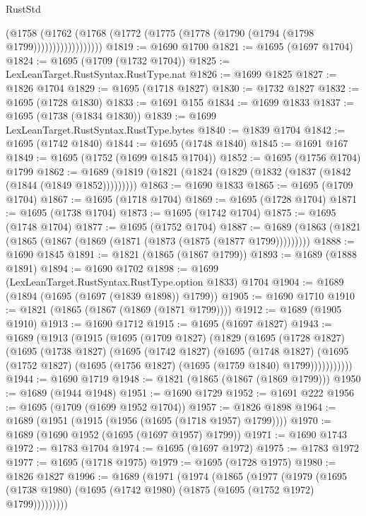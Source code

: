 \begin{lexlean}{RustStd}
\begin{coremodule}
                      (@1758
                        (@1762
                          (@1768 (@1772 (@1775 (@1778 (@1790 (@1794 (@1798 @1799))))))))))))))))))
@1819 := @1690 @1700
@1821 := @1695 (@1697 @1704)
@1824 := @1695 (@1709 (@1732 @1704))
@1825 := LexLeanTarget.RustSyntax.RustType.nat
@1826 := @1699 @1825
@1827 := @1826 @1704
@1829 := @1695 (@1718 @1827)
@1830 := @1732 @1827
@1832 := @1695 (@1728 @1830)
@1833 := @1691 @155
@1834 := @1699 @1833
@1837 := @1695 (@1738 (@1834 @1830))
@1839 := @1699 LexLeanTarget.RustSyntax.RustType.bytes
@1840 := @1839 @1704
@1842 := @1695 (@1742 @1840)
@1844 := @1695 (@1748 @1840)
@1845 := @1691 @167
@1849 := @1695 (@1752 (@1699 @1845 @1704))
@1852 := @1695 (@1756 @1704) @1799
@1862 := @1689 (@1819 (@1821 (@1824 (@1829 (@1832 (@1837 (@1842 (@1844 (@1849 @1852)))))))))
@1863 := @1690 @1833
@1865 := @1695 (@1709 @1704)
@1867 := @1695 (@1718 @1704)
@1869 := @1695 (@1728 @1704)
@1871 := @1695 (@1738 @1704)
@1873 := @1695 (@1742 @1704)
@1875 := @1695 (@1748 @1704)
@1877 := @1695 (@1752 @1704)
@1887 := @1689 (@1863 (@1821 (@1865 (@1867 (@1869 (@1871 (@1873 (@1875 (@1877 @1799)))))))))
@1888 := @1690 @1845
@1891 := @1821 (@1865 (@1867 @1799))
@1893 := @1689 (@1888 @1891)
@1894 := @1690 @1702
@1898 := @1699 (LexLeanTarget.RustSyntax.RustType.option @1833) @1704
@1904 := @1689 (@1894 (@1695 (@1697 (@1839 @1898)) @1799))
@1905 := @1690 @1710
@1910 := @1821 (@1865 (@1867 (@1869 (@1871 @1799))))
@1912 := @1689 (@1905 @1910)
@1913 := @1690 @1712
@1915 := @1695 (@1697 @1827)
@1943 := @1689
    (@1913
      (@1915
        (@1695
          (@1709 @1827)
          (@1829
            (@1695
              (@1728 @1827)
              (@1695
                (@1738 @1827)
                (@1695
                  (@1742 @1827)
                  (@1695
                    (@1748 @1827)
                    (@1695 (@1752 @1827) (@1695 (@1756 @1827) (@1695 (@1759 @1840) @1799)))))))))))
@1944 := @1690 @1719
@1948 := @1821 (@1865 (@1867 (@1869 @1799)))
@1950 := @1689 (@1944 @1948)
@1951 := @1690 @1729
@1952 := @1691 @222
@1956 := @1695 (@1709 (@1699 @1952 @1704))
@1957 := @1826 @1898
@1964 := @1689 (@1951 (@1915 (@1956 (@1695 (@1718 @1957) @1799))))
@1970 := @1689 (@1690 @1952 (@1695 (@1697 @1957) @1799))
@1971 := @1690 @1743
@1972 := @1783 @1704
@1974 := @1695 (@1697 @1972)
@1975 := @1783 @1972
@1977 := @1695 (@1718 @1975)
@1979 := @1695 (@1728 @1975)
@1980 := @1826 @1827
@1996 := @1689
    (@1971
      (@1974
        (@1865
          (@1977
            (@1979
              (@1695 (@1738 @1980) (@1695 (@1742 @1980) (@1875 (@1695 (@1752 @1972) @1799)))))))))

\end{coremodule}
\end{lexlean}
